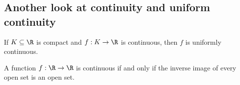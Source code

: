 \documentclass{article}
\begin{document}
\subsection{Another look at continuity and uniform continuity}

\begin{proposition}[Notes 2.23]
    If $K\subseteq\R$ is compact and $f:K\to\R$ is continuous, then $f$ is 
    uniformly continuous. 
\end{proposition}

\begin{proposition}[Notes 2.24]
    A function $f:\R\to\R$ is continuous if and only if the inverse image of every 
    open set is an open set. 
\end{proposition}
\end{document}

